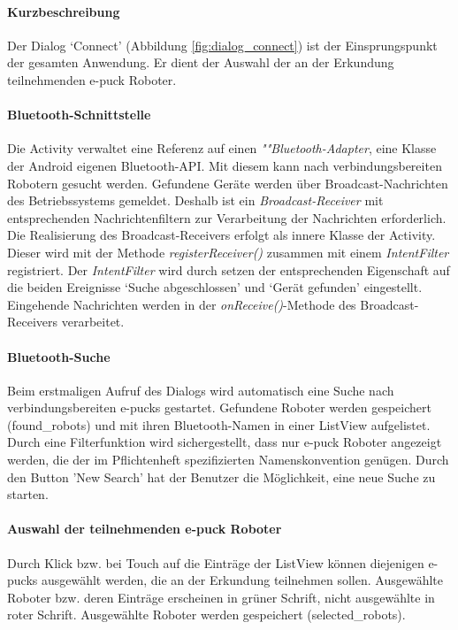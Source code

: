 \documentclass[10pt,a4paper]{article}
\begin{document}
	\paragraph*{Kurzbeschreibung} Der Dialog `Connect' (Abbildung \ref{fig:dialog_connect}) ist der Einsprungspunkt der gesamten Anwendung. Er dient
	der Auswahl der an der Erkundung teilnehmenden e-puck Roboter. 
	
	\paragraph*{Bluetooth-Schnittstelle} Die Activity verwaltet eine Referenz auf einen \textit{""Blue\-tooth-A\-dap\-ter}, eine Klasse der Android
	eigenen Bluetooth-API. Mit diesem kann nach verbindungsbereiten Robotern gesucht werden. Gefundene Geräte werden über Broadcast-Nachrichten des
	Betriebssystems gemeldet. Deshalb ist ein \textit{Broadcast-Receiver} mit entsprechenden Nachrichtenfiltern zur Verarbeitung der Nachrichten
	erforderlich.
	Die Realisierung des Broadcast-Receivers erfolgt als innere Klasse der Activity. Dieser wird mit der Methode \textit{registerReceiver()} zusammen
	mit einem \textit{IntentFilter} registriert.
	Der \textit{IntentFilter} wird durch setzen der entsprechenden Eigenschaft auf die beiden Ereignisse `Suche abgeschlossen' und `Gerät gefunden'
	eingestellt. Eingehende Nachrichten werden in der \textit{onReceive()}-Methode des Broadcast-Receivers verarbeitet.
	
	\paragraph*{Bluetooth-Suche} Beim erstmaligen Aufruf des Dialogs wird automatisch eine Suche nach verbindungsbereiten e-pucks gestartet. 
	Gefundene Roboter werden gespeichert (found\_robots) und mit ihren Bluetooth-Namen in einer ListView aufgelistet. Durch eine 
	Filterfunktion wird sichergestellt, dass nur e-puck Roboter angezeigt werden, die der im Pflichtenheft spezifizierten Namenskonvention genügen.
	Durch den Button 'New Search' hat der Benutzer die Möglichkeit, eine neue Suche zu starten. 
	
	\paragraph*{Auswahl der teilnehmenden e-puck Roboter} Durch Klick bzw. bei Touch auf die Einträge der ListView können diejenigen e-pucks
	ausgewählt werden, die an der Erkundung teilnehmen sollen. Ausgewählte Roboter bzw. deren Einträge erscheinen in grüner Schrift, nicht
	ausgewählte in roter Schrift. Ausgewählte Roboter werden gespeichert (selected\_robots).
	
\end{document}
